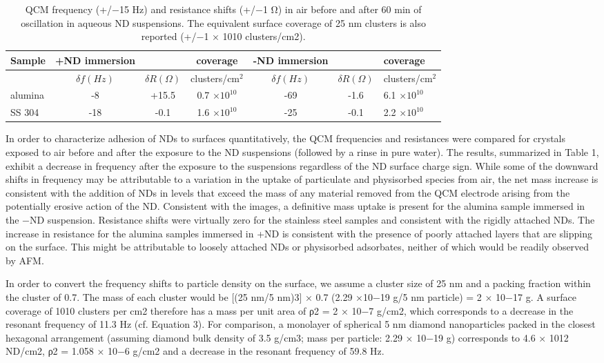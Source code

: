 \begin{table}
	\caption{QCM frequency (+/$-$15 Hz) and resistance shifts (+/$−$1 Ω) in air before and after 60 min of oscillation in aqueous ND suspensions. The equivalent surface coverage of 25 nm clusters is also reported (+/−1 × 1010 clusters/cm2).}
	\label{table-one}
	\begin{center}
		\begin{tabular}{lcccccl}
			\toprule
			Sample & +ND immersion & & coverage & -ND immersion & & coverage\\
			
			\midrule
			& $\delta f (Hz)$ &  $\delta R (\Omega)$ & clusters/cm$^{2}$ & $\delta f (Hz)$ &  $\delta R (\Omega)$ & clusters/cm$^{2}$\\
			\midrule
			alumina & -8 & +15.5 & 0.7 $\times 10^{10}$ & -69 & -1.6 & 6.1 $\times 10^{10}$\\
			SS 304 	& -18 & -0.1 & 1.6 $\times 10^{10}$ & -25 & -0.1 & 2.2 $\times 10^{10}$\\
			
			\bottomrule
		\end{tabular}
	\end{center}
\end{table}

In order to characterize adhesion of NDs to surfaces quantitatively, the QCM frequencies and resistances were compared for crystals exposed to air before and after the exposure to the ND suspensions (followed by a rinse in pure water). The results, summarized in Table 1, exhibit a decrease in frequency after the exposure to the suspensions regardless of the ND surface charge sign. While some of the downward shifts in frequency may be attributable to a variation in the uptake of particulate and physisorbed species from air, the net mass increase is consistent with the addition of NDs in levels that exceed the mass of any material removed from the QCM electrode arising from the potentially erosive action of the ND. Consistent with the images, a definitive mass uptake is present for the alumina sample immersed in the −ND suspension. Resistance shifts were virtually zero for the stainless steel samples and consistent with the rigidly attached NDs. The increase in resistance for the alumina samples immersed in +ND is consistent with the presence of poorly attached layers that are slipping on the surface. This might be attributable to loosely attached NDs or physisorbed adsorbates, neither of which would be readily observed by AFM.

In order to convert the frequency shifts to particle density on the surface, we assume a cluster size of 25 nm and a packing fraction within the cluster of 0.7. The mass of each cluster would be [(25 nm/5 nm)3] × 0.7 (2.29 ×10−19 g/5 nm particle) = 2 × 10−17 g. A surface coverage of 1010 clusters per cm2 therefore has a mass per unit area of ρ2 = 2 × 10−7 g/cm2, which corresponds to a decrease in the resonant frequency of 11.3 Hz (cf.
Equation 3). For comparison, a monolayer of spherical 5 nm diamond nanoparticles packed in the closest hexagonal arrangement (assuming diamond bulk density of 3.5 g/cm3; mass per particle: 2.29 × 10−19 g) corresponds to 4.6 × 1012 ND/cm2, ρ2 = 1.058 × 10−6 g/cm2 and a decrease in the resonant frequency of 59.8 Hz.

